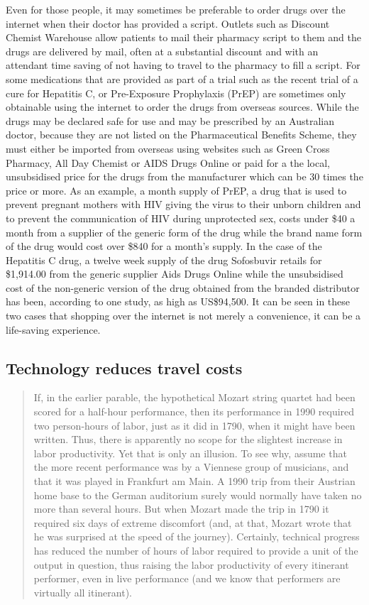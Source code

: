Even for those people, it may sometimes be preferable to order drugs over the internet when their doctor has provided a script. Outlets such as Discount Chemist Warehouse allow patients to mail their pharmacy script to them and the drugs are delivered by mail, often at a substantial discount and with an attendant time saving of not having to travel to the pharmacy to fill a script. For some medications that are provided as part of a trial such as the recent trial of a cure for Hepatitis C, or Pre-Exposure Prophylaxis (PrEP) are sometimes only obtainable using the internet to order the drugs from overseas sources. While the drugs may be declared safe for use and may be prescribed by an Australian doctor, because they are not listed on the Pharmaceutical Benefits Scheme, they must either be imported from overseas using websites such as Green Cross Pharmacy, All Day Chemist or AIDS Drugs Online or paid for a the local, unsubsidised price for the drugs from the manufacturer which can be 30 times the price or more. As an example, a month supply of PrEP, a drug that is used to prevent pregnant mothers with HIV giving the virus to their unborn children and to prevent the communication of HIV during unprotected sex, costs under \$40 a month from a supplier of the generic form of the drug while the brand name form of the drug would cost over \$840 for a month's supply.  In the case of the Hepatitis C drug, a twelve week supply of the drug Sofosbuvir retails for \$1,914.00 from the generic supplier Aids Drugs Online while the unsubsidised cost of the non-generic version of the drug obtained from the branded distributor has been, according to one study, as high as US\$94,500\cite{RefWorks:376}. It can be seen in these two cases that shopping over the internet is not merely a convenience, it can be a life-saving experience.



\subsection{Technology reduces travel costs}
\begin{quotation}
If, in the earlier parable, the hypothetical Mozart string quartet had been scored for a half-hour performance, then its performance in 1990 required two person-hours of labor, just as it did in 1790, when it might have been written. Thus, there is apparently no scope for the slightest increase in labor productivity. Yet that is only an illusion. To see why, assume that the more recent performance was by a Viennese group of musicians, and that it was played in Frankfurt am Main. A 1990 trip from their Austrian home base to the German auditorium surely would normally have taken no more than several hours. But when Mozart made the trip in 1790 it required six days of extreme discomfort (and, at that, Mozart wrote that he was surprised at the speed of the journey). Certainly, technical progress has reduced the number of hours of labor required to provide a unit of the output in question, thus raising the labor productivity of every itinerant performer, even in live performance (and we know that performers are virtually all itinerant).\cite{RefWorks:208}
\end{quotation}

